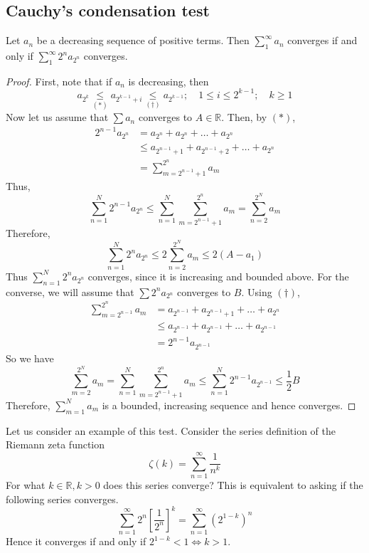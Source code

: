 \subsection{Cauchy's condensation test}
\begin{theorem}
	Let \(a_n\) be a decreasing sequence of positive terms.
	Then \(\sum_1^\infty a_n\) converges if and only if \(\sum_1^\infty 2^n a_{2^n}\) converges.
\end{theorem}
\begin{proof}
	First, note that if \(a_n\) is decreasing, then
	\[
		a_{2^k} \underset{(\ast)}{\leq} a_{2^{k-1} + i} \underset{(\dagger)}{\leq} a_{2^{k-1}};\quad 1 \leq i \leq 2^{k-1};\quad k \geq 1
	\]
	Now let us assume that \(\sum a_n\) converges to \(A \in \mathbb R\).
	Then, by \((\ast)\),
	\begin{align*}
		2^{n-1} a_{2^n} & = a_{2^n} + a_{2^n} + \dots + a_{2^n}                \\
		                & \leq a_{2^{n-1}+1} + a_{2^{n-1}+2} + \dots + a_{2^n} \\
		                & = \sum_{m=2^{n-1}+1}^{2^n}a_m
	\end{align*}
	Thus,
	\[
		\sum_{n=1}^N 2^{n-1}a_{2^n} \leq \sum_{n=1}^N \sum_{m=2^{n-1}+1}^{2^n} a_m = \sum_{n=2}^{2^N} a_m
	\]
	Therefore,
	\[
		\sum_{n=1}^N 2^n a_{2^n} \leq 2 \sum_{n=2}^{2^N} a_m \leq 2(A-a_1)
	\]
	Thus \(\sum_{n=1}^N 2^n a_{2^n}\) converges, since it is increasing and bounded above.
	For the converse, we will assume that \(\sum 2^n a_{2^n}\) converges to \(B\).
	Using \((\dagger)\),
	\begin{align*}
		\sum_{m=2^{n-1}}^{2^n} a_m & = a_{2^{n-1}} + a_{2^{n-1}+1} + \dots + a_{2^n}      \\
		                           & \leq a_{2^{n-1}} + a_{2^{n-1}} + \dots + a_{2^{n-1}} \\
		                           & = 2^{n-1}a_{2^{n-1}}
	\end{align*}
	So we have
	\[
		\sum_{m=2}^{2^N} a_m = \sum_{n=1}^N \sum_{m=2^{n-1}+1}^{2^n} a_m \leq \sum_{n=1}^N 2^{n-1} a_{2^{n-1}} \leq \frac{1}{2} B
	\]
	Therefore, \(\sum_{m=1}^N a_m\) is a bounded, increasing sequence and hence converges.
\end{proof}
\noindent Let us consider an example of this test.
Consider the series definition of the Riemann zeta function
\[
	\zeta(k) = \sum_{n=1}^\infty \frac{1}{n^k}
\]
For what \(k \in \mathbb R, k>0\) does this series converge?
This is equivalent to asking if the following series converges.
\[
	\sum_{n=1}^\infty 2^n \left[ \frac{1}{2^n} \right]^k = \sum_{n=1}^\infty \left( 2^{1-k} \right)^n
\]
Hence it converges if and only if \(2^{1-k} < 1 \iff k > 1\).

